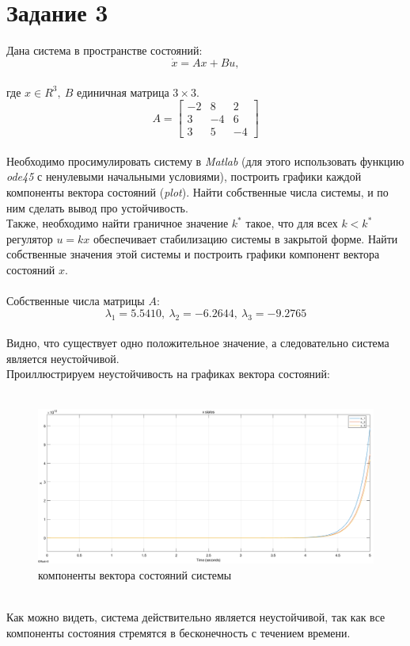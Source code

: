 \documentclass[12pt]{article}
\begin{document}
\section*{Задание 3}
Дана система в пространстве состояний:
\[
\dot{x} = Ax + Bu,
\]\\
где $x \in R^3,\ B$ единичная матрица $3 \times 3$.
\[
A = \begin{bmatrix}
-2 & 8 & 2\\
3 & -4 & 6\\
3 & 5 & -4
\end{bmatrix}
\]\\
Необходимо просимулировать систему в \emph{Matlab} (для этого использовать функцию \emph{ode45} с ненулевыми начальными условиями), построить графики каждой компоненты вектора состояний (\emph{plot}). Найти собственные числа системы, и по ним сделать вывод про устойчивость.\\
Также, необходимо найти граничное значение $k^*$ такое, что для всех $k<k^*$ регулятор $u = kx$ обеспечивает стабилизацию системы в закрытой форме. Найти собственные значения этой системы и построить графики компонент вектора состояний $x$.\\
\ \\
Собственные числа матрицы $A$:
\[
\lambda_1 = 5.5410,\ \lambda_2 = -6.2644,\ \lambda_3 = -9.2765
\]\\
Видно, что существует одно положительное значение, а следовательно система является неустойчивой. \\
Проиллюстрируем неустойчивость на графиках вектора состояний:\\
\ \\
\begin{figure}[h]
    \centering
    \includegraphics[width=\textwidth]{x_states}
    \caption{компоненты вектора состояний системы}
    \label{fig:x_states}
\end{figure} \\
Как можно видеть, система действительно является неустойчивой, так как все компоненты состояния стремятся в бесконечность с течением времени. \\
\end{document}
